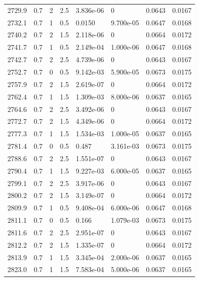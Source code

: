 \documentclass[preview]{standalone}
\begin{document}
{{{{{{{{\begin{tabular}{L{1.2cm}C{1.2cm} C{0.3cm}C{0.5cm} C{1.4cm}C{1.4cm} C{1.4cm}C{1.4cm}}
  2729.9  &   0.7  & 2     & 2.5 &  3.836e-06  & 0  & 0.0643 &  0.0167   \\ 
  2732.1  &   0.7  & 1     & 0.5 &  0.0150  & 9.700e-05  & 0.0647 &  0.0168   \\ 
  2740.2  &   0.7  & 2     & 1.5 &  2.118e-06  & 0  & 0.0664 &  0.0172   \\ 
  2741.7  &   0.7  & 1     & 0.5 &  2.149e-04  & 1.000e-06  & 0.0647 &  0.0168   \\ 
  2742.7  &   0.7  & 2     & 2.5 &  4.739e-06  & 0  & 0.0643 &  0.0167   \\ 
  2752.7  &   0.7  & 0     & 0.5 &  9.142e-03  & 5.900e-05  & 0.0673 &  0.0175   \\ 
  2757.9  &   0.7  & 2     & 1.5 &  2.619e-07  & 0  & 0.0664 &  0.0172   \\ 
  2762.4  &   0.7  & 1     & 1.5 &  1.309e-03  & 8.000e-06  & 0.0637 &  0.0165   \\ 
  2764.6  &   0.7  & 2     & 2.5 &  3.492e-06  & 0  & 0.0643 &  0.0167   \\ 
  2772.7  &   0.7  & 2     & 1.5 &  4.349e-06  & 0  & 0.0664 &  0.0172   \\ 
  2777.3  &   0.7  & 1     & 1.5 &  1.534e-03  & 1.000e-05  & 0.0637 &  0.0165   \\ 
  2781.4  &   0.7  & 0     & 0.5 &  0.487  & 3.161e-03  & 0.0673 &  0.0175   \\ 
  2788.6  &   0.7  & 2     & 2.5 &  1.551e-07  & 0  & 0.0643 &  0.0167   \\ 
  2790.4  &   0.7  & 1     & 1.5 &  9.227e-03  & 6.000e-05  & 0.0637 &  0.0165   \\ 
  2799.1  &   0.7  & 2     & 2.5 &  3.917e-06  & 0  & 0.0643 &  0.0167   \\ 
  2800.2  &   0.7  & 2     & 1.5 &  3.149e-07  & 0  & 0.0664 &  0.0172   \\ 
  2809.9  &   0.7  & 1     & 0.5 &  9.408e-04  & 6.000e-06  & 0.0647 &  0.0168   \\ 
  2811.1  &   0.7  & 0     & 0.5 &  0.166  & 1.079e-03  & 0.0673 &  0.0175   \\ 
  2811.6  &   0.7  & 2     & 2.5 &  2.951e-07  & 0  & 0.0643 &  0.0167   \\ 
  2812.2  &   0.7  & 2     & 1.5 &  1.335e-07  & 0  & 0.0664 &  0.0172   \\ 
  2813.9  &   0.7  & 1     & 1.5 &  3.345e-04  & 2.000e-06  & 0.0637 &  0.0165   \\ 
  2823.0  &   0.7  & 1     & 1.5 &  7.583e-04  & 5.000e-06  & 0.0637 &  0.0165   \\ 

\end{tabular}}}}}}}}}
\end{document}
